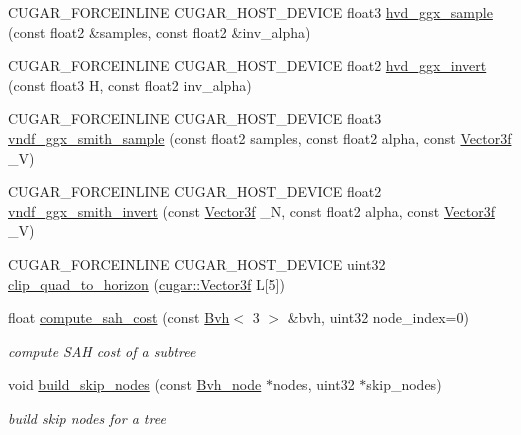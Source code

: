 \begin{DoxyCompactItemize}
\item 
C\+U\+G\+A\+R\+\_\+\+F\+O\+R\+C\+E\+I\+N\+L\+I\+NE C\+U\+G\+A\+R\+\_\+\+H\+O\+S\+T\+\_\+\+D\+E\+V\+I\+CE float3 \hyperlink{group___b_s_d_f_module_gaa94fad7af98e50d2b2abe6801df8bd93}{hvd\+\_\+ggx\+\_\+sample} (const float2 \&samples, const float2 \&inv\+\_\+alpha)
\item 
C\+U\+G\+A\+R\+\_\+\+F\+O\+R\+C\+E\+I\+N\+L\+I\+NE C\+U\+G\+A\+R\+\_\+\+H\+O\+S\+T\+\_\+\+D\+E\+V\+I\+CE float2 \hyperlink{group___b_s_d_f_module_ga009dbdc5ba0035fc161335607c2b328d}{hvd\+\_\+ggx\+\_\+invert} (const float3 H, const float2 inv\+\_\+alpha)
\item 
C\+U\+G\+A\+R\+\_\+\+F\+O\+R\+C\+E\+I\+N\+L\+I\+NE C\+U\+G\+A\+R\+\_\+\+H\+O\+S\+T\+\_\+\+D\+E\+V\+I\+CE float3 \hyperlink{group___b_s_d_f_module_gaae32e76bc82f281f61485ea552aba53a}{vndf\+\_\+ggx\+\_\+smith\+\_\+sample} (const float2 samples, const float2 alpha, const \hyperlink{structcugar_1_1_vector}{Vector3f} \+\_\+V)
\item 
C\+U\+G\+A\+R\+\_\+\+F\+O\+R\+C\+E\+I\+N\+L\+I\+NE C\+U\+G\+A\+R\+\_\+\+H\+O\+S\+T\+\_\+\+D\+E\+V\+I\+CE float2 \hyperlink{group___b_s_d_f_module_gabe2116f566e70937f1abb126140afae8}{vndf\+\_\+ggx\+\_\+smith\+\_\+invert} (const \hyperlink{structcugar_1_1_vector}{Vector3f} \+\_\+N, const float2 alpha, const \hyperlink{structcugar_1_1_vector}{Vector3f} \+\_\+V)
\item 
C\+U\+G\+A\+R\+\_\+\+F\+O\+R\+C\+E\+I\+N\+L\+I\+NE C\+U\+G\+A\+R\+\_\+\+H\+O\+S\+T\+\_\+\+D\+E\+V\+I\+CE uint32 \hyperlink{group___b_s_d_f_module_ga0ddbffc856042ea191e9ed868fe58ca9}{clip\+\_\+quad\+\_\+to\+\_\+horizon} (\hyperlink{structcugar_1_1_vector}{cugar\+::\+Vector3f} L\mbox{[}5\mbox{]})
\item 
float \hyperlink{group__bvh_ga3f50a853dcace7bd0d1a8503f0ef00fe}{compute\+\_\+sah\+\_\+cost} (const \hyperlink{structcugar_1_1_bvh}{Bvh}$<$ 3 $>$ \&bvh, uint32 node\+\_\+index=0)
\begin{DoxyCompactList}\small\item\em compute S\+AH cost of a subtree \end{DoxyCompactList}\item 
void \hyperlink{group__bvh_ga0b0f275e25ece0b073a2b866a31cf9e2}{build\+\_\+skip\+\_\+nodes} (const \hyperlink{structcugar_1_1_bvh__node}{Bvh\+\_\+node} $\ast$nodes, uint32 $\ast$skip\+\_\+nodes)
\begin{DoxyCompactList}\small\item\em build skip nodes for a tree \end{DoxyCompactList}\item 

\end{DoxyCompactItemize}
